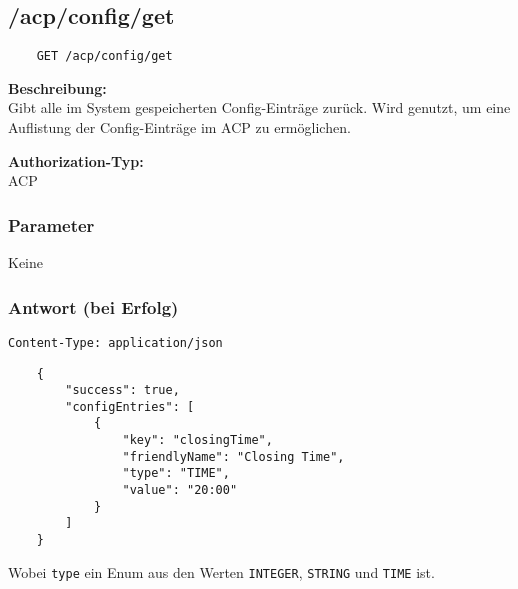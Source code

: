 \subsection{/acp/config/get}

\begin{lstlisting}
    GET /acp/config/get
\end{lstlisting}

\textbf{Beschreibung:} \\
Gibt alle im System gespeicherten Config-Einträge zurück. Wird genutzt, um eine Auflistung der Config-Einträge im ACP zu ermöglichen.

\textbf{Authorization-Typ:} \\
ACP

\subsubsection{Parameter}
Keine

\subsubsection{Antwort (bei Erfolg)}

\lstinline{Content-Type: application/json}
\begin{lstlisting}
    {
        "success": true, 
        "configEntries": [
            {
                "key": "closingTime",
                "friendlyName": "Closing Time",
                "type": "TIME",
                "value": "20:00"
            }
        ]
    }
\end{lstlisting}

Wobei \lstinline{type} ein Enum aus den Werten \lstinline{INTEGER}, \lstinline{STRING} und \lstinline{TIME} ist.